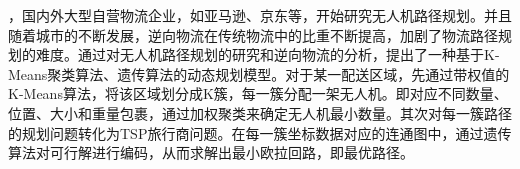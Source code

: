 \documentclass[10.5pt,twocolumn]{jbuaa}
\begin{document}
\begin{@twocolumnfalse}
			\begin{CAbstractJBUAA}
				，国内外大型自营物流企业，如亚马逊、京东等，开始研究无人机路径规划。并且随着城市的不断发展，逆向物流在传统物流中的比重不断提高，加剧了物流路径规划的难度。通过对无人机路径规划的研究和逆向物流的分析，提出了一种基于K-Means聚类算法、遗传算法的动态规划模型。对于某一配送区域，先通过带权值的K-Means算法，将该区域划分成K簇，每一簇分配一架无人机。即对应不同数量、位置、大小和重量包裹，通过加权聚类来确定无人机最小数量。其次对每一簇路径的规划问题转化为TSP旅行商问题。在每一簇坐标数据对应的连通图中，通过遗传算法对可行解进行编码，从而求解出最小欧拉回路，即最优路径。
			\end{CAbstractJBUAA}

			\positiontextbox{2.0cm}{27.4cm}{
				\noindent\rule{4cm}{.5pt}\\[0.5ex]%
				\hspace*{1em} \liuhao \linespread{0.8}\selectfont
				\parbox{\textwidth}{%
				}
			}


			\begin{flushleft}
				\parbox{\textwidth}{

					 \vspace{-2mm}%

}
\end{flushleft}
\end{@twocolumnfalse}
\end{document}
